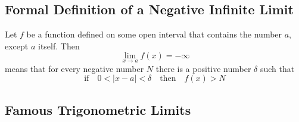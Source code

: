 \subsection*{Formal Definition of a Negative Infinite Limit}

Let \(f\) be a function defined on some open interval that contains the number \(a\), except \(a\) itself. Then
$$\lim_{x \to a}f(x)=-\infty$$
means that for every negative number \(N\) there is a positive number \(\delta\) such that 
$$\text{if} \quad 0< \left| x-a \right| <\delta \quad \text{then} \quad f(x)>N$$

\subsection*{Famous Trigonometric Limits}

